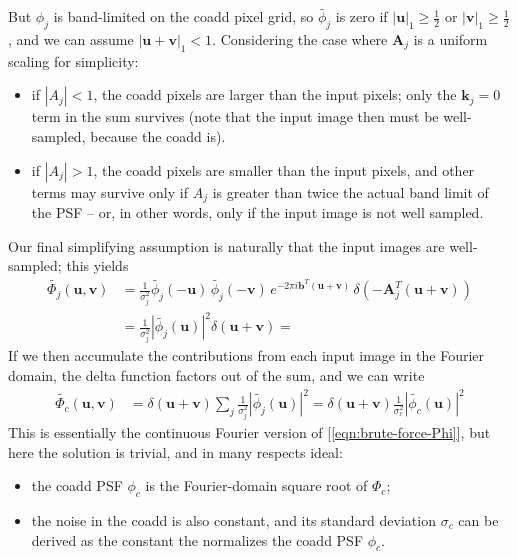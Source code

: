 \documentclass[DM,authoryear,toc]{lsstdoc}
\begin{document}
But $\phi_j$ is band-limited on the coadd pixel grid, so $\widetilde{\phi_j}$ is zero if $|\symbf{u}|_1 \ge \frac{1}{2}$ or $|\symbf{v}|_1 \ge \frac{1}{2}$, and we can assume $|\symbf{u} + \symbf{v}|_1 < 1$.
Considering the case where $\symbf{A}_j$ is a uniform scaling for simplicity:
\begin{itemize}
    \item if $|A_j| < 1$, the coadd pixels are larger than the input pixels; only the $\symbf{k}_j = 0$ term in the sum survives (note that the input image then must be well-sampled, because the coadd is).
    \item if $|A_j| > 1$, the coadd pixels are smaller than the input pixels, and other terms may survive only if $A_j$ is greater than twice the actual band limit of the PSF -- or, in other words, only if the input image is not well sampled.
\end{itemize}

Our final simplifying assumption is naturally that the input images are well-sampled; this yields
\begin{align}
    \widetilde{\Phi_j}(\symbf{u}, \symbf{v}) &= \frac{1}{\sigma_j^2}
        \widetilde{\phi_j}(-\symbf{u}) \, \widetilde{\phi_j}(-\symbf{v}) \,
        e^{-2\pi i \symbf{b}^T(\symbf{u}+\symbf{v})} \,
        \delta\left(-\symbf{A}_j^T (\symbf{u} + \symbf{v}) \right) \\
    &= \frac{1}{\sigma_j^2}
        \left|\widetilde{\phi_j}(\symbf{u})\right|^2
        \delta(\symbf{u} + \symbf{v})
    =
\end{align}
If we then accumulate the contributions from each input image in the Fourier domain, the delta function factors out of the sum, and we can write
\begin{align}
    \widetilde{\Phi_c}(\symbf{u}, \symbf{v})
        &= \delta(\symbf{u} + \symbf{v})
            \sum_j \frac{1}{\sigma_j^2} \left|\widetilde{\phi_j}(\symbf{u})\right|^2
        = \delta(\symbf{u} + \symbf{v})
            \frac{1}{\sigma_c^2} \left|\widetilde{\phi_c}(\symbf{u})\right|^2
\end{align}
This is essentially the continuous Fourier version of [\ref{eqn:brute-force-Phi}], but here the solution is trivial, and in many respects ideal:
\begin{itemize}
    \item the coadd PSF $\phi_c$ is the Fourier-domain square root of $\Phi_c$;
    \item the noise in the coadd is also constant, and its standard deviation $\sigma_c$ can be derived as the constant the normalizes the coadd PSF $\phi_c$.
\end{itemize}
\end{document}

